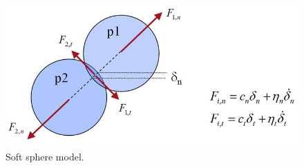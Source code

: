 \begin{figure}[!htb]
\centering
\includegraphics[width=.80\columnwidth]{images/062collision}
\caption[Soft sphere model]{Soft sphere model.}
\label{fig:062collision}
\end{figure}